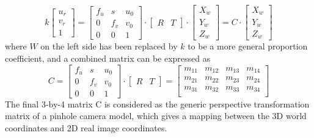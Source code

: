 \begin{equation}
%
k \left[ \begin{array}{c} u_r \\ v_r \\ 1 \end{array} \right] %
=  \begin{bmatrix} f_u & s & u_0 \\ 0 & f_v & v_0 \\ 0 & 0 & 1 \end{bmatrix} \cdot%
\begin{bmatrix} R & T \end{bmatrix} \cdot \left[ \begin{array}{c} X_w \\ Y_w \\ Z_w \end{array} \right]%
=  C \cdot \left[ \begin{array}{c} X_w \\ Y_w \\ Z_w \end{array} \right]%
%
\end{equation}%
%
where \(W\) on the left side has been replaced by \(k\) to be a more general proportion coefficient, and a combined matrix can be expressed as
\begin{equation}
%
C %
=  \begin{bmatrix} f_u & s & u_0 \\ 0 & f_v & v_0 \\ 0 & 0 & 1 \end{bmatrix} \cdot%
\begin{bmatrix} R & T \end{bmatrix}%
= \begin{bmatrix} 
m_{11} & m_{12} & m_{13} & m_{14} \\
m_{21} & m_{22} & m_{23} & m_{24} \\
m_{31} & m_{32} & m_{33} & m_{34} \\
\end{bmatrix}%
%
\end{equation}%
%
The final 3-by-4 matrix C is considered as the generic perspective transformation matrix of a pinhole camera model, which gives a mapping between the 3D world coordinates and 2D real image coordinates.\par

